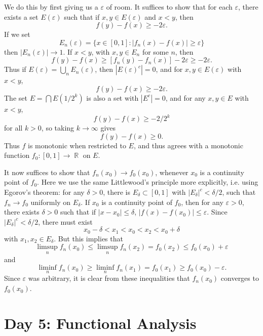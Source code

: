 \documentclass[answers]{exam}
\DeclareMathOperator{\RR}{\mathbb{R}}
\begin{document}
\begin{questions}
\begin{solution}
	We do this by first giving us a $\varepsilon$ of room. It suffices to show that for each $\varepsilon$, there exists a set $E(\varepsilon)$ such that if $x,y \in E(\varepsilon)$ and $x < y$, then
	\[ f(y) - f(x) \geq - 2 \varepsilon. \]
	If we set
	\[ E_n(\varepsilon) = \{ x \in [0,1] : |f_n(x) - f(x)| \geq \varepsilon \} \]
	then $|E_n(\varepsilon)| \to 1$. If $x < y$, with $x,y \in E_n$ for some $n$, then
	\[ f(y) - f(x) \geq [f_n(y) - f_n(x)] - 2 \varepsilon \geq -2\varepsilon. \]
	Thus if $E(\varepsilon) = \bigcup_n E_n(\varepsilon)$, then $|E(\varepsilon)^c| = 0$, and for $x,y \in E(\varepsilon)$ with $x < y$,
	\[ f(y) - f(x) \geq - 2 \varepsilon. \]
	The set $E = \bigcap E(1/2^k)$ is also a set with $|E^c| = 0$, and for any $x,y \in E$ with $x < y$,
	\[ f(y) - f(x) \geq - 2 / 2^k \]
	for all $k > 0$, so taking $k \to \infty$ gives
	\[ f(y) - f(x) \geq 0. \]
	Thus $f$ is monotonic when restricted to $E$, and thus agrees with a monotonic function $f_0: [0,1] \to \RR$ on $E$.

	It now suffices to show that $f_n(x_0) \to f_0(x_0)$, whenever $x_0$ is a continuity point of $f_0$. Here we use the same Littlewood's principle more explicitly, i.e. using Egorov's theorem: for any $\delta > 0$, there is $E_\delta \subset [0,1]$ with $|E_\delta|^c < \delta/2$, such that $f_n \to f_0$ uniformly on $E_\delta$. If $x_0$ is a continuity point of $f_0$, then for any $\varepsilon > 0$, there exists $\delta > 0$ such that if $|x - x_0| \leq \delta$, $|f(x) - f(x_0)| \leq \varepsilon$. Since $|E_\delta|^c < \delta/2$, there must exist
	\[ x_0 - \delta < x_1 < x_0 < x_2 < x_0 + \delta \]
	with $x_1,x_2 \in E_\delta$. But this implies that
	\[ \limsup_n f_n(x_0) \leq \limsup_n f_n(x_2) = f_0(x_2) \leq f_0(x_0) + \varepsilon \]
	and
	\[ \liminf_n f_n(x_0) \geq \liminf_n f_n(x_1) = f_0(x_1) \geq f_0(x_0) - \varepsilon. \]
	Since $\varepsilon$ was arbitrary, it is clear from these inequalities that $f_n(x_0)$ converges to $f_0(x_0)$.
\end{solution}

\newpage
\section{Day 5: Functional Analysis}


\end{questions}
\end{document}
